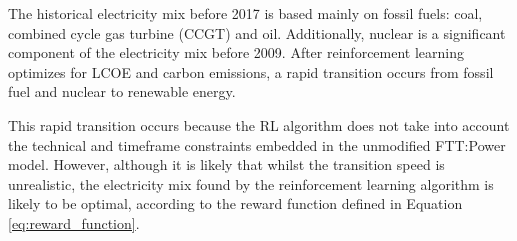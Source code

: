 \documentclass{article}
\begin{document}
The historical electricity mix before 2017 is based mainly on fossil fuels: coal, combined cycle gas turbine (CCGT) and oil. Additionally, nuclear is a significant component of the electricity mix before 2009. After reinforcement learning optimizes for LCOE and carbon emissions, a rapid transition occurs from fossil fuel and nuclear to renewable energy. 

This rapid transition occurs because the RL algorithm does not take into account the technical and timeframe constraints embedded in the unmodified FTT:Power model. However, although it is likely that whilst the transition speed is unrealistic, the electricity mix found by the reinforcement learning algorithm is likely to be optimal, according to the reward function defined in Equation \ref{eq:reward_function}.



\end{document}
